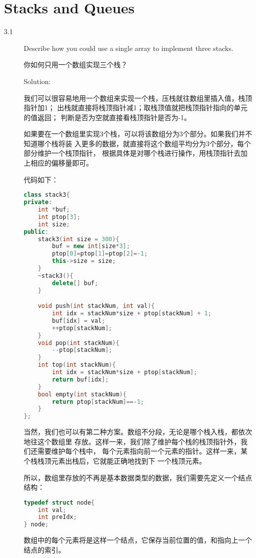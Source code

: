 \chapter{Stacks and Queues}
\small{}

\begin{description}
\item[3.1] Describe how you could use a single array to implement three stacks.

你如何只用一个数组实现三个栈？

Solution: 

我们可以很容易地用一个数组来实现一个栈，压栈就往数组里插入值，栈顶指针加1； 出栈就直接将栈顶指针减1；取栈顶值就把栈顶指针指向的单元的值返回； 判断是否为空就直接看栈顶指针是否为-1。

如果要在一个数组里实现3个栈，可以将该数组分为3个部分。如果我们并不知道哪个栈将装 入更多的数据，就直接将这个数组平均分为3个部分，每个部分维护一个栈顶指针， 根据具体是对哪个栈进行操作，用栈顶指针去加上相应的偏移量即可。

代码如下：

\begin{lstlisting}[language=C++]
class stack3{
private:
    int *buf;
    int ptop[3];
    int size;
public:
    stack3(int size = 300){
        buf = new int[size*3];
        ptop[0]=ptop[1]=ptop[2]=-1;
        this->size = size;
    }
    ~stack3(){
        delete[] buf;
    }

    void push(int stackNum, int val){
        int idx = stackNum*size + ptop[stackNum] + 1;
        buf[idx] = val;
        ++ptop[stackNum];
    }
    void pop(int stackNum){
        --ptop[stackNum];
    }
    int top(int stackNum){
        int idx = stackNum*size + ptop[stackNum];
        return buf[idx];
    }
    bool empty(int stackNum){
        return ptop[stackNum]==-1;
    }
};
\end{lstlisting}

当然，我们也可以有第二种方案。数组不分段，无论是哪个栈入栈，都依次地往这个数组里 存放。这样一来，我们除了维护每个栈的栈顶指针外，我们还需要维护每个栈中， 每个元素指向前一个元素的指针。这样一来，某个栈栈顶元素出栈后，它就能正确地找到下 一个栈顶元素。

所以，数组里存放的不再是基本数据类型的数据，我们需要先定义一个结点结构：

\begin{lstlisting}[language=C++]
typedef struct node{
    int val;
    int preIdx;
} node;
\end{lstlisting}

数组中的每个元素将是这样一个结点，它保存当前位置的值，和指向上一个结点的索引。


\end{description}
